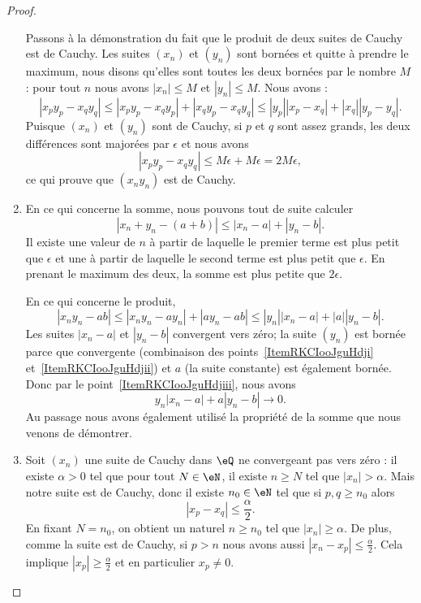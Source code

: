 \begin{proof}
\begin{enumerate}
		      Passons à la démonstration du fait que le produit de deux suites de Cauchy est de Cauchy. Les suites \( (x_n)\) et \( (y_n)\) sont bornées et quitte à prendre le maximum, nous disons qu'elles sont toutes les deux bornées par le nombre \( M\) : pour tout \( n\) nous avons \( | x_n |\leq M\) et \( | y_n |\leq M\). Nous avons :
		      \begin{equation}
			      | x_py_p-x_qy_q |\leq | x_py_p-x_qy_p |+| x_qy_p-x_qy_q |\leq | y_p | |x_p-x_q |+| x_q | |y_p-y_q |.
		      \end{equation}
		      Puisque \( (x_n)\) et \( (y_n)\) sont de Cauchy, si \( p\) et \( q\) sont assez grands, les deux différences sont majorées par \( \epsilon\) et nous avons
		      \begin{equation}
			      | x_py_p-x_qy_q |\leq M\epsilon+M\epsilon=2M\epsilon,
		      \end{equation}
		      ce qui prouve que \( (x_ny_n)\) est de Cauchy.
		\item
		      En ce qui concerne la somme, nous pouvons tout de suite calculer
		      \begin{equation}
			      | x_n+y_n-(a+b) |\leq | x_n-a |+| y_n-b |.
		      \end{equation}
		      Il existe une valeur de \( n\) à partir de laquelle le premier terme est plus petit que \( \epsilon\) et une à partir de laquelle le second terme est plus petit que \( \epsilon\). En prenant le maximum des deux, la somme est plus petite que \( 2\epsilon\).

		      En ce qui concerne le produit,
		      \begin{equation}
			      | x_ny_n-ab |\leq | x_ny_n-ay_n |+| ay_n-ab |\leq | y_n || x_n-a |+| a || y_n-b |.
		      \end{equation}
		      Les suites \( | x_n-a |\) et \( | y_n-b |\) convergent vers zéro; la suite \( (y_n)\) est bornée parce que convergente (combinaison des points~\ref{ItemRKCIooJguHdji} et~\ref{ItemRKCIooJguHdjii})  et \( a\) (la suite constante) est également bornée. Donc par le point~\ref{ItemRKCIooJguHdjiii}, nous avons
		      \begin{equation}
			      y_n| x_n-a |+a| y_n-b |\to 0.
		      \end{equation}
		      Au passage nous avons également utilisé la propriété de la somme que nous venons de démontrer.
		\item Soit \( (x_n)\) une suite de Cauchy dans \( \eQ\) ne convergeant pas vers zéro : il existe \( \alpha>0\) tel que pour tout \( N\in \eN\), il existe \( n\geq N\) tel que \( | x_n |>\alpha\). Mais notre suite est de Cauchy, donc il existe \( n_0\in \eN\) tel que si \( p,q\geq n_0\) alors
		      \begin{equation}
			      | x_p-x_q |\leq \frac{ \alpha }{2}.
		      \end{equation}
		      En fixant \( N = n_0\), on obtient un naturel \( n\geq n_0\) tel que \( | x_n |\geq \alpha\). De plus, comme la suite est de Cauchy, si \( p>n\) nous avons aussi \( | x_n-x_p |\leq \frac{ \alpha }{2}\). Cela implique \( | x_p |\geq \frac{ \alpha }{2}\) et en particulier \( x_p\neq 0\).


\end{enumerate}
\end{proof}
